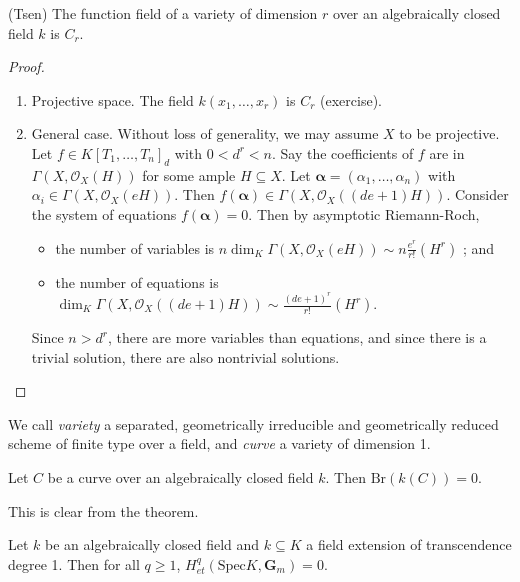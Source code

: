 \begin{theorem}
\label{theorem-tsen}
(Tsen)
The function field of a variety of dimension $r$ over an algebraically closed
field $k$ is $C_r$.
\end{theorem}

\begin{proof}
\begin{enumerate}
\item
Projective space. The field $k(x_1, \ldots, x_r)$ is $C_r$ (exercise).
\item
General case. Without loss of generality, we may assume $X$ to be projective.
Let $f \in K[T_1, \dots, T_n]_d$ with $0 < d^r <n$. Say the coefficients of $f$
are in $\Gamma(X,\mathcal{O}_X(H))$ for some ample $H \subseteq X$. Let
$\mathbf{\alpha} = (\alpha_1, \dots, \alpha_n)$ with $\alpha_i \in \Gamma(X,
\mathcal{O}_X(eH))$. Then $f(\mathbf{\alpha}) \in \Gamma(X,
\mathcal{O}_X((de+1)H))$. Consider the system of equations $f(\mathbf{\alpha})
=0$. Then by asymptotic Riemann-Roch,
\begin{itemize}
\item
the number of variables is $n\dim_K \Gamma(X,\mathcal{O}_X(eH)) \sim
n\frac{e^r}{r!} (H^r)$ ; and
\item
the number of equations is $\dim_K \Gamma(X,\mathcal{O}_X((de+1)H)) \sim
\frac{(de+1)^r}{r!} (H^r).$
\end{itemize}
Since $n> d^r$, there are more variables than equations, and since there is a
trivial solution, there are also nontrivial solutions.
\end{enumerate}
\end{proof}

\begin{definition}
\label{definition-variety}
We call {\it variety} a separated, geometrically irreducible and geometrically
reduced scheme of finite type over a field, and {\it curve} a variety of
dimension 1.
\end{definition}

\begin{lemma}
\label{lemma-curve-brauer-zero}
Let $C$ be a curve over an algebraically closed field $k$. Then
$\text{Br}(k(C)) = 0$.
\end{lemma}

\noindent
This is clear from the theorem.

\begin{lemma}
\label{lemma-cohomology-Gm-function-field-curve}
Let $k$ be an algebraically closed field and $k \subseteq K$ a field extension
of transcendence degree 1. Then for all $q \geq 1$, $H_{et}^q(\text{Spec} K,
\mathbf{G}_m) = 0$.
\end{lemma}

